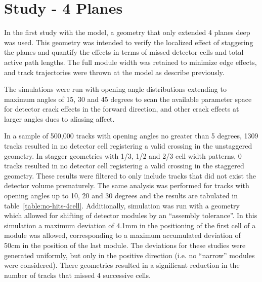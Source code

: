 \section{Study - 4 Planes}

In the first study with the model, a geometry that only extended 4 planes deep was used.  This geometry was intended to verify the localized effect of staggering the planes and quantify the effects in terms of missed detector cells and total active path lengths.  The full module width was retained to minimize edge effects, and track trajectories were thrown at the model as describe previously.

The simulations were run with opening angle distributions extending to maximum angles of 15, 30 and 45 degrees to scan the available parameter space for detector crack effects in the forward direction, and other crack effects at larger angles dues to aliasing affect.

In a sample of 500,000 tracks with opening angles no greater than 5 degrees, 1309 tracks resulted in no detector cell registering a valid crossing in the unstaggered geometry.  In stagger geometries with 1/3, 1/2 and 2/3 cell width patterns, 0 tracks resulted in no detector cell registering a valid crossing in the staggered geometry.  These results were filtered to only include tracks that did not exist the detector volume prematurely.  The same analysis was performed for tracks with opening angles up to 10, 20 and 30 degrees and the results are tabulated in table~\ref{table:no-hits-4cell}.  Additionally, simulation was run with a geometry which allowed for shifting of detector modules by an ``assembly tolerance''.  In this simulation a maximum deviation of 4.1mm in the positioning of the first cell of a module was allowed, corresponding to a maximum accumulated deviation of 50cm in the position of the last module.  The deviations for these studies were generated uniformly, but only in the positive direction (i.e. no ``narrow'' modules were considered).  There geometries resulted in a significant reduction in the number of tracks that missed 4 successive cells.

